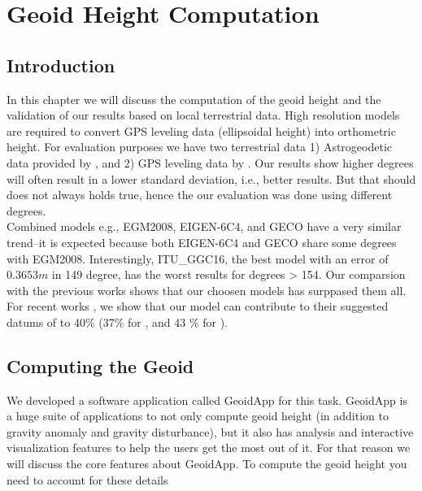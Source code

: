 \chapter{Geoid Height Computation}
\label{Chapter4}


\section{Introduction}
In this chapter we will discuss the computation of the geoid height and the validation of our results based on local terrestrial data. High resolution models are required to convert GPS leveling data (ellipsoidal height) into orthometric height. For evaluation purposes we have two terrestrial data 1) Astrogeodetic data provided by \cite{osman}, and 2) GPS leveling data by \cite{ahmed_msc}. Our results show higher degrees will often result in a lower standard deviation, i.e., better results. But that should does not always holds true, hence the our evaluation was done using different degrees.
\\
Combined models e.g., EGM2008, EIGEN-6C4, and GECO have a very similar trend--it is expected because both EIGEN-6C4 and GECO share some degrees with EGM2008. Interestingly, ITU\_GGC16, the best model with an error of $0.3653m$ in 149 degree, has the worst results for degrees > 154. Our comparsion with the previous works \citep{ahmed_msc, fashir, godah} shows that our choosen models has surppased them all. For recent works \citep{ahmed_msc, godah}, we show that our model can contribute to their suggested datums of to 40\% (37\% for \citep{ahmed_msc}, and 43 \% for \citep{godah}).



\section{Computing the Geoid}

We developed a software application called GeoidApp for this task. GeoidApp is a huge suite of applications to not only compute geoid height (in addition to gravity anomaly and gravity disturbance), but it also has analysis and interactive visualization features to help the users get the most out of it. For that reason we will discuss the core features about GeoidApp. To compute the geoid height you need to account for these details

